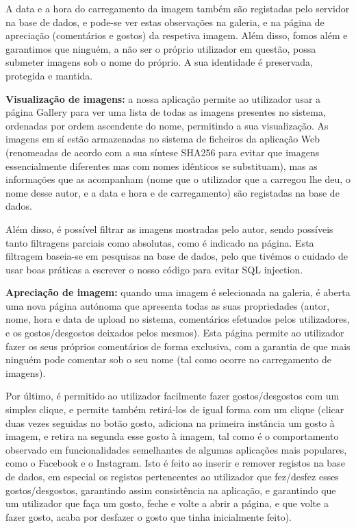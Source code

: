 \documentclass{report}
\begin{document}
    \linebreak
    \bigskip
    
    A data e a hora do carregamento da imagem também são registadas pelo servidor na base de dados, e pode-se ver estas observações na galeria, e na página de apreciação (comentários e gostos) da respetiva imagem. Além disso, fomos além e garantimos que ninguém, a não ser o próprio utilizador em questão, possa submeter imagens sob o nome do próprio. A sua identidade é preservada, protegida e mantida.
    
    \linebreak
    \bigskip
    \bigskip
    \bigskip
    
    \textbf{Visualização de imagens:} a nossa aplicação permite ao utilizador usar a página Gallery para ver uma lista de todas as imagens presentes no sistema, ordenadas por ordem ascendente do nome, permitindo a sua visualização. As imagens
em sí estão armazenadas no sistema de ficheiros da aplicação Web (renomeadas de acordo com a sua síntese SHA256 para evitar que imagens essencialmente diferentes mas com nomes idênticos se substituam), mas as informações que as acompanham (nome que o utilizador que a carregou lhe deu, o nome desse autor, e a data e hora e de carregamento) são registadas na base de dados.

\linebreak
\bigskip

    Além disso, é possível filtrar as imagens mostradas pelo autor, sendo possíveis tanto filtragens parciais como absolutas, como é indicado na página. Esta filtragem baseia-se em pesquisas na base de dados, pelo que tivémos o cuidado de usar boas práticas a escrever o nosso código para evitar SQL injection.
    
    \newpage
    
    \textbf{Apreciação de imagem:} quando uma imagem é selecionada na galeria, é aberta uma nova página autónoma que apresenta todas as suas propriedades (autor, nome, hora e data de upload no sistema, comentários efetuados pelos utilizadores, e os gostos/desgostos deixados pelos mesmos). Esta página permite ao utilizador fazer os seus próprios comentários de forma exclusiva, com a garantia de que mais ninguém pode comentar sob o seu nome (tal como ocorre no carregamento de imagens).
    
    \linebreak
    \bigskip
    
    Por último, é permitido ao utilizador facilmente fazer gostos/desgostos com um simples clique, e permite também retirá-los de igual forma com um clique (clicar duas vezes seguidas no botão gosto, adiciona na primeira instância um gosto à imagem, e retira na segunda esse gosto à imagem, tal como é o comportamento observado em funcionalidades semelhantes de algumas aplicações mais populares, como o Facebook e o Instagram. Isto é feito ao inserir e remover registos na base de dados, em especial os registos pertencentes ao utilizador que fez/desfez esses gostos/desgostos, garantindo assim consistência na aplicação, e garantindo que um utilizador que faça um gosto, feche e volte a abrir a página, e que volte a fazer gosto, acaba por desfazer o gosto que tinha inicialmente feito).
    
\end{document}
